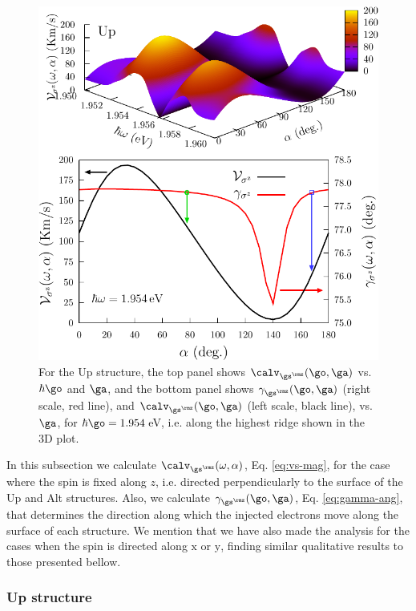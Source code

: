 \documentclass[prb,11pt,tightenlines,twocolumn,aps]{revtex4-1}
\begin{document}
\begin{figure}[t]
\centering
\includegraphics[width=\linewidth]{upplots/up-vsz-w2}
\caption{For the Up structure, the top panel shows $\calv_{\gs^\rmz} (\go,\ga)$
vs. $\hbar\go$ and $\ga$, and the bottom panel shows $\gamma_{\gs^\rmz}
(\go,\ga)$ (right scale, red line), and $\calv_{\gs^\rmz} (\go,\ga)$ (left
scale, black line), vs. $\ga$, for $\hbar\go=1.954$\,eV, i.e. along the
highest ridge shown in the 3D plot. }
\label{fig:up-vsz-w2}
\end{figure}

In this subsection we calculate $\calv_{\gs^\rmz}(\omega,\alpha)$, Eq.
\eqref{eq:vs-mag}, for the case where the spin is fixed along $z$, i.e.
directed perpendicularly to the surface of the Up and Alt structures. Also, we
calculate $\gamma_{\gs^\rmz}(\go,\ga)$, Eq. \eqref{eq:gamma-ang}, that
determines the direction along which the injected electrons move along the
surface of  each structure. We mention that we have also made the analysis for
the cases when the spin  is directed along $\mathrm{x}$ or $\mathrm{y}$,
finding similar qualitative results to those presented bellow.
% 

\subsubsection{Up structure}\label{up:fs}
\end{document}
